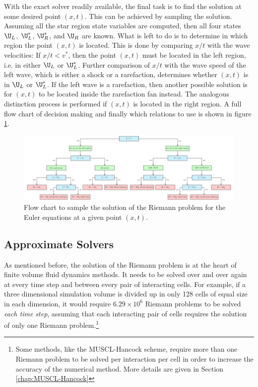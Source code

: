 With the exact solver readily available, the final task is to find the solution at some desired
point $(x, t)$. This can be achieved by sampling the solution. Assuming all the star region state
variables are computed, then all four states $\U_L$, $\U_L^*$, $\U_R^*$, and $\U_R$ are known. What
is left to do is to determine in which region the point $(x, t)$ is located. This is done by
comparing $x/t$ with the wave velocities: If $x / t < v^*$, then the point $(x, t)$ must be located
in the left region, i.e. in either $\U_L$ or $\U_L^*$. Further comparison of $x / t$ with the wave
speed of the left wave, which is either a shock or a rarefaction, determines whether $(x, t)$ is in
$\U_L$ or $\U_L^*$. If the left wave is a rarefaction, then another possible solution is for $(x,t)$
to be located inside the rarefaction fan instead. The analogous distinction process is performed if
$(x, t)$ is located in the right region. A full flow chart of decision making and finally which
relations to use is shown in figure \ref{fig:sampling-solution}.


\begin{figure}
	\includegraphics[width=\textheight]{./figures/FV/tikz/sampling_the_solution.pdf}%
	\caption[Flowchart on sampling the solution]{Flow chart to sample the solution of the Riemann
problem for the Euler equations at a given point $(x, t)$.
		\label{fig:sampling-solution}
	}
\end{figure}










\subsection{Approximate Solvers}\label{chap:riemann-approximate}


As mentioned before, the solution of the Riemann problem is at the heart of finite volume fluid
dynamics methods. It needs to be solved over and over again at every time step and between every
pair of interacting cells. For example, if a three dimensional simulation volume is divided up in
only 128 cells of equal size in each dimension, it would require $6.29 \times 10^6$ Riemann
problems to be solved \emph{each time step}, assuming that each interacting pair of cells requires
the solution of only one Riemann problem.\footnote{Some methods, like the MUSCL-Hancock scheme,
require more than one Riemann problem to be solved per interaction per cell in order to increase
the accuracy of the numerical method. More details are given in Section \ref{chap:MUSCL-Hancock}}



